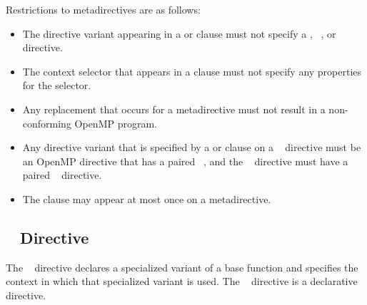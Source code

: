 \vspace{-1ex}  %
\restrictions
Restrictions to metadirectives are as follows:

\begin{itemize}
\item The directive variant appearing in a  or 
      clause must not specify a ,
      ~, or ~
      directive.
\item The context selector that appears in a  clause must not
      specify any properties for the  selector.
\item Any replacement that occurs for a metadirective must not result in a
      non-conforming OpenMP program.
\item Any directive variant that is specified by a  or 
      clause on a ~
      directive must be an OpenMP directive that has a paired 
      ~, and the ~ 
      directive must have a paired ~ directive.
\item The  clause may appear at most once on a metadirective.
\end{itemize}



\subsection{~ Directive}
\label{subsec:declare variant Directive}
\summary
The ~ directive declares a specialized variant
of a base function and specifies the context in which that specialized variant
is used. The ~ directive is a declarative
directive.

